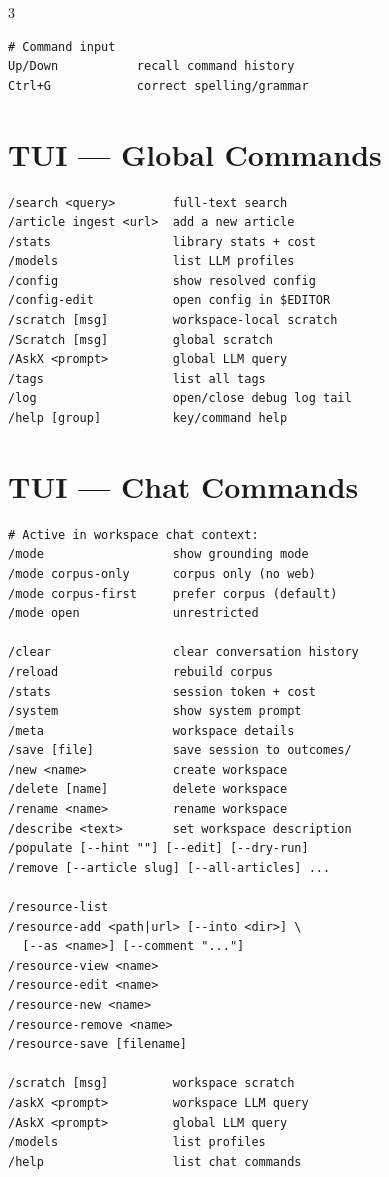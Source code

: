 \documentclass[10pt,a4paper,landscape]{article}
\begin{document}
\begin{multicols}{3}
\begin{lstlisting}
# Command input
Up/Down           recall command history
Ctrl+G            correct spelling/grammar
\end{lstlisting}

\section{TUI — Global Commands}

\begin{lstlisting}
/search <query>        full-text search
/article ingest <url>  add a new article
/stats                 library stats + cost
/models                list LLM profiles
/config                show resolved config
/config-edit           open config in $EDITOR
/scratch [msg]         workspace-local scratch
/Scratch [msg]         global scratch
/AskX <prompt>         global LLM query
/tags                  list all tags
/log                   open/close debug log tail
/help [group]          key/command help
\end{lstlisting}

\section{TUI — Chat Commands}

\begin{lstlisting}
# Active in workspace chat context:
/mode                  show grounding mode
/mode corpus-only      corpus only (no web)
/mode corpus-first     prefer corpus (default)
/mode open             unrestricted

/clear                 clear conversation history
/reload                rebuild corpus
/stats                 session token + cost
/system                show system prompt
/meta                  workspace details
/save [file]           save session to outcomes/
/new <name>            create workspace
/delete [name]         delete workspace
/rename <name>         rename workspace
/describe <text>       set workspace description
/populate [--hint ""] [--edit] [--dry-run]
/remove [--article slug] [--all-articles] ...

/resource-list
/resource-add <path|url> [--into <dir>] \
  [--as <name>] [--comment "..."]
/resource-view <name>
/resource-edit <name>
/resource-new <name>
/resource-remove <name>
/resource-save [filename]

/scratch [msg]         workspace scratch
/askX <prompt>         workspace LLM query
/AskX <prompt>         global LLM query
/models                list profiles
/help                  list chat commands
\end{lstlisting}


\end{multicols}
\end{document}
